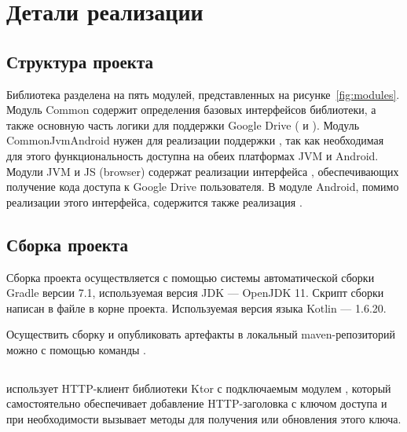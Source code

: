 \section{Детали реализации} \label{solution-details}

\subsection{Структура проекта}
    
    Библиотека \cite{gh-multifs} разделена на пять модулей, представленных на рисунке~\ref{fig:modules}. Модуль Common содержит определения базовых интерфейсов библиотеки, а также основную часть логики для поддержки Google Drive ( и ). Модуль CommonJvmAndroid нужен для реализации поддержки , так как необходимая для этого функциональность доступна на обеих платформах JVM и Android. Модули JVM и JS (browser) содержат реализации интерфейса , обеспечивающих получение кода доступа к Google Drive пользователя. В модуле Android, помимо реализации этого интерфейса, содержится также реализация .
    

\subsection{Сборка проекта}
    Сборка проекта осуществляется с помощью системы автоматической сборки Gradle\cite{gradle} версии 7.1, используемая версия JDK --- OpenJDK 11. Скрипт сборки написан в файле  в корне проекта. Используемая версия языка Kotlin --- 1.6.20.

    Осуществить сборку и опубликовать артефакты в локальный maven-репозиторий можно с помощью команды .


\subsection{}
    \subsubsection{}
         использует HTTP-клиент библиотеки Ktor с подключаемым модулем , который самостоятельно обеспечивает добавление HTTP-заголовка  с ключом доступа и при необходимости вызывает методы для получения или обновления этого ключа.

